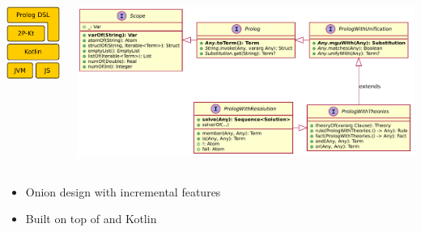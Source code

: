 \documentclass[presentation]{beamer}
\begin{document}
\begin{frame}
    \begin{columns}
        \centering
        \begin{column}{.15\linewidth}
            \centering
            \includegraphics[width=\linewidth]{img/layers}
        \end{column}
        \hfill
        \begin{column}{.84\linewidth}
            \includegraphics[width=\linewidth]{img/dsl-types}
        \end{column}
    \end{columns}

    \vfill

    \begin{itemize}
        \item Onion design with incremental features
        \item Built on top of \twopkt{} and Kotlin
    \end{itemize}

\end{frame}
\end{document}
